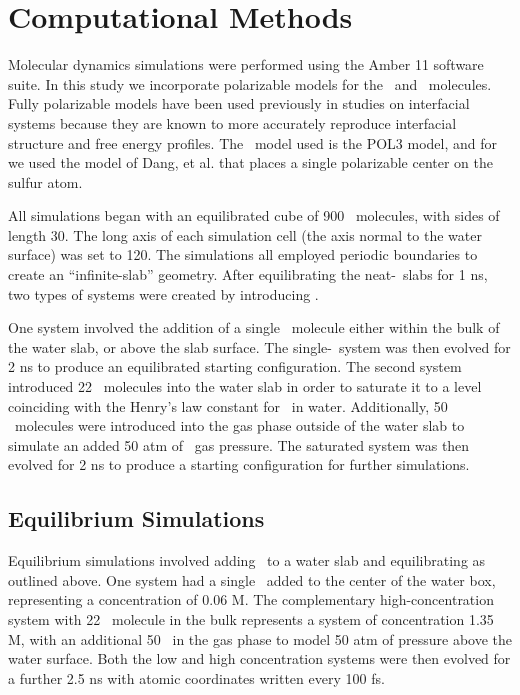 \section{Computational Methods}

Molecular dynamics simulations were performed using the Amber 11 software suite.\cite{Case2010} In this study we incorporate polarizable models for the \wat~and \suldiox~molecules. Fully polarizable models have been used previously in studies on interfacial systems because they are known to more accurately reproduce interfacial structure and free energy profiles.\cite{Wick2007,Rivera2006,Dang1998} The \wat~model used is the POL3 model,\cite{Caldwell1995} and for \suldiox we used the model of Dang, et al. that places a single polarizable center on the sulfur atom.\cite{Baer2010}

All simulations began with an equilibrated cube of 900 \wat~molecules, with sides of length 30\angs. The long axis of each simulation cell (the axis normal to the water surface) was set to 120\angs. The simulations all employed periodic boundaries to create an ``infinite-slab'' geometry. After equilibrating the neat-\wat~slabs for 1 ns, two types of systems were created by introducing \suldiox. 

One system involved the addition of a single \suldiox~molecule either within the bulk of the water slab, or above the slab surface. The single-\suldiox~system was then evolved for 2 ns to produce an equilibrated starting configuration. The second system introduced 22 \suldiox~molecules into the water slab in order to saturate it to a level coinciding with the Henry's law constant for \suldiox~in water. Additionally, 50 \suldiox~molecules were introduced into the gas phase outside of the water slab to simulate an added 50 atm of \suldiox~gas pressure. The saturated system was then evolved for 2 ns to produce a starting configuration for further simulations.

\subsection{Equilibrium Simulations}

Equilibrium simulations involved adding \suldiox~to a water slab and equilibrating as outlined above. One system had a single \suldiox~added to the center of the water box, representing a concentration of 0.06 M. The complementary high-concentration system with 22 \suldiox~molecule in the bulk represents a system of concentration 1.35 M, with an additional 50 \suldiox~in the gas phase to model 50 atm of pressure above the water surface. Both the low and high concentration systems were then evolved for a further 2.5 ns with atomic coordinates written every 100 fs. 

